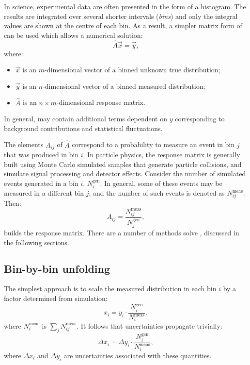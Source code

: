 In science, experimental data are often presented in the form of a histogram. 
The results are integrated over several shorter intervals (\textit{bins}) and only the integral values are shown at the centre of each bin.
As a result, a simpler matrix form of  can be used which allows a numerical solution:
\begin{equation}\label{eq:unfolding_linear_equation}
\hat{A}\vec{x}=\vec{y},
\end{equation}
where:
\begin{itemize}
    \item $\vec{x}$ is an $m$-dimensional vector of a binned unknown true distribution;
    \item $\vec{y}$ is an $n$-dimensional vector of a binned measured distribution;
    \item $\hat{A}$ is an $n\times m$-dimensional response matrix.

\end{itemize}
In general,  may contain additional terms dependent on $y$ corresponding to background contributions and statistical fluctuations.

The elements $A_{ij}$ of $\hat{A}$ correspond to a probability to measure an event in bin $j$ that was produced in bin $i$.
In particle physics, the response matrix is generally built using Monte Carlo simulated samples that generate particle collisions, and simulate signal processing and detector effects.
Consider the number of simulated events generated in a bin $i$, $N_i^{\mathrm{gen}}$. 
In general, some of these events may be measured in a different bin $j$, and the number of such events is denoted as $N_{ij}^{\mathrm{meas}}$.
Then:
\begin{equation}\label{eq:response_matrix_element}
    A_{ij} = \frac{N_{ij}^{\mathrm{meas}}}{N_j^{\mathrm{gen}}},
\end{equation}
builds the response matrix.
There are a number of methods solve , discussed in the following sections.

\subsection{Bin-by-bin unfolding}

The simplest approach is to scale the measured distribution in each bin $i$ by a factor determined from simulation:
\begin{equation}\label{eq:bin_by_bin_unfolding}
 x_i = y_i \cdot \frac{N_i^{\mathrm{gen}}}{N_i^{\mathrm{meas}}},
\end{equation}
where $N_i^{\mathrm{meas}}$ is $\sum_j N_{ij}^{\mathrm{meas}}$.
It follows that uncertainties propagate trivially:
\begin{equation}\label{eq:bin_by_bin_unfolding_error}
    \Delta x_i = \Delta y_i \cdot \frac{N_i^{\mathrm{gen}}}{N_i^{\mathrm{meas}}},
\end{equation}
where $\Delta x_i$ and $\Delta y_i$ are uncertainties associated with these quantities.

